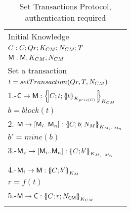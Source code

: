 \begin{table}[htb]
\footnotesize
\begin{center}
\caption{Set Transactions Protocol, authentication required}
\label{table:ProtSetTrans}
\begin{tabular}{|l|}
\hline
           Initial Knowledge                                                             \\
            $C:C; Qr ;  K_{CM} ; N_{CM} ; T$               \\
            $\textsf{M}: \textsf{M}; K_{CM} ; N_{CM}$    \\ \hline \hline 
           Set a transaction                                                                        \\
           \hspace{5mm} $t=setTransaction(Qr,T,N_{CM})$                                  \\  
           1.-$\Client\rightarrow \Server: \fat{C \lnk t \lnk \fat{t}_{K_{priv(C)}}}_{K_{\client\serverW}}$          \\ 
           \hspace{5mm} $b=block(t)$                                  \\  
           2.-$\Server\rightarrow [\Server_i .. \Server_n]: \fat{C \lnk b \lnk N_\serverW}_{K_{\serverW_i .. \serverW_n}}$          \\ 
           \hspace{5mm} $b'=mine(b)$                                  \\  
           3.-$\Server_x\rightarrow [\Server_i .. \Server_n]: \fat{C \lnk b'}_{K_{\serverW_i .. \serverW_n}}$          \\            
                                             \\  
           4.-$\Server_i\rightarrow \Server: \fat{C \lnk b'}_{K_{\serverW}}$          \\            
           \hspace{5mm} $r=f(t)$                                  \\  
           5.-$\Server\rightarrow \Client: \fat{C \lnk r \lnk N_{\Client\Server}}_{K_{\client\serverW}}$       \\\\  \hline \hline
\end{tabular}
\end{center}
\end{table}
\normalsize
